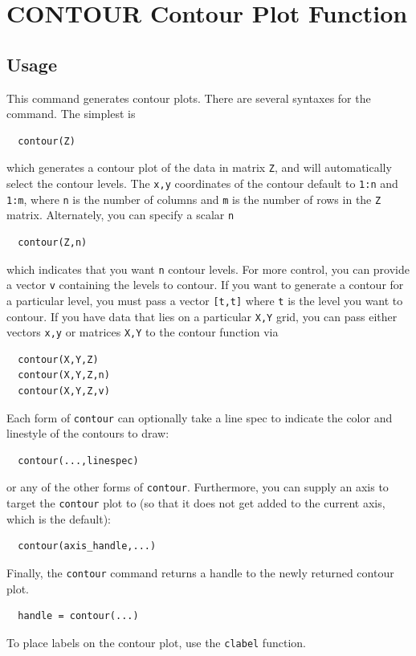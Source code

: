 \section{CONTOUR Contour Plot Function}

\subsection{Usage}

This command generates contour plots.  There are several syntaxes for
the command.  The simplest is
\begin{verbatim}
  contour(Z)
\end{verbatim}
which generates a contour plot of the data in matrix \verb|Z|, and will
automatically select the contour levels.  The \verb|x,y| coordinates of the
contour default to \verb|1:n| and \verb|1:m|, where \verb|n| is the number of
columns and \verb|m| is the number of rows in the \verb|Z| matrix.  Alternately,
you can specify a scalar \verb|n|
\begin{verbatim}
  contour(Z,n)
\end{verbatim}
which indicates that you want \verb|n| contour levels.  For more control,
you can provide a vector \verb|v| containing the levels to contour.  If you
want to generate a contour for a particular level, you must pass a
vector \verb|[t,t]| where \verb|t| is the level you want to contour.  If you
have data that lies on a particular \verb|X,Y| grid, you can pass either
vectors \verb|x,y| or matrices \verb|X,Y| to the contour function via
\begin{verbatim}
  contour(X,Y,Z)
  contour(X,Y,Z,n)
  contour(X,Y,Z,v)
\end{verbatim}
Each form of \verb|contour| can optionally take a line spec to indicate the
color and linestyle of the contours to draw:
\begin{verbatim}
  contour(...,linespec)
\end{verbatim}
or any of the other forms of \verb|contour|.  Furthermore, you can supply an
axis to target the \verb|contour| plot to (so that it does not get added to
the current axis, which is the default):
\begin{verbatim}
  contour(axis_handle,...)
\end{verbatim}
Finally, the \verb|contour| command returns a handle to the newly returned
contour plot. 
\begin{verbatim}
  handle = contour(...)
\end{verbatim}
To place labels on the contour plot, use the \verb|clabel| function.
